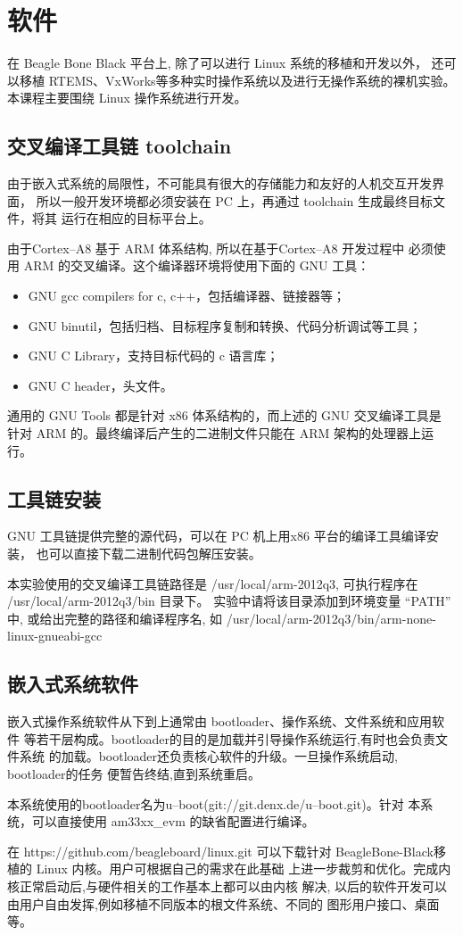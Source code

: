 \section{软件}

	在 Beagle Bone Black 平台上, 除了可以进行 Linux 系统的移植和开发以外，
还可以移植 RTEMS、VxWorks等多种实时操作系统以及进行无操作系统的裸机实验。
本课程主要围绕 Linux 操作系统进行开发。

\subsection{交叉编译工具链 toolchain}
	由于嵌入式系统的局限性，不可能具有很大的存储能力和友好的人机交互开发界面，
所以一般开发环境都必须安装在 PC 上，再通过 toolchain 生成最终目标文件，将其
运行在相应的目标平台上。

	由于Cortex--A8 基于 ARM 体系结构, 所以在基于Cortex--A8 开发过程中
必须使用 ARM 的交叉编译。这个编译器环境将使用下面的 GNU 工具：
\begin{itemize}\itemsep=-3pt
  \item GNU gcc compilers for c, c++，包括编译器、链接器等；
  \item GNU binutil，包括归档、目标程序复制和转换、代码分析调试等工具；
  \item GNU C Library，支持目标代码的 c 语言库；
  \item GNU C header，头文件。
\end{itemize}
	通用的 GNU Tools 都是针对 x86 体系结构的，而上述的 GNU 交叉编译工具是
针对 ARM 的。最终编译后产生的二进制文件只能在 ARM 架构的处理器上运行。

\subsection{工具链安装}
	GNU 工具链提供完整的源代码，可以在 PC 机上用x86 平台的编译工具编译安装，
也可以直接下载二进制代码包解压安装。

	本实验使用的交叉编译工具链路径是 /usr/local/arm-2012q3, 可执行程序在
 /usr/local/arm-2012q3/bin 目录下。 实验中请将该目录添加到环境变量 ``PATH''
中, 或给出完整的路径和编译程序名, 如
/usr/local/arm-2012q3/bin/arm-none-linux-gnueabi-gcc

\subsection{嵌入式系统软件}
	嵌入式操作系统软件从下到上通常由 bootloader、操作系统、文件系统和应用软件
等若干层构成。bootloader的目的是加载并引导操作系统运行,有时也会负责文件系统
的加载。bootloader还负责核心软件的升级。一旦操作系统启动, bootloader的任务
便暂告终结,直到系统重启。

	本系统使用的bootloader名为u--boot(git://git.denx.de/u--boot.git)。针对
本系统，可以直接使用 am33xx\_evm 的缺省配置进行编译。

	在 https://github.com/beagleboard/linux.git 可以下载针对
	BeagleBone-Black移植的 Linux 内核。用户可根据自己的需求在此基础
上进一步裁剪和优化。完成内核正常启动后,与硬件相关的工作基本上都可以由内核
解决, 以后的软件开发可以由用户自由发挥,例如移植不同版本的根文件系统、不同的
图形用户接口、桌面等。
